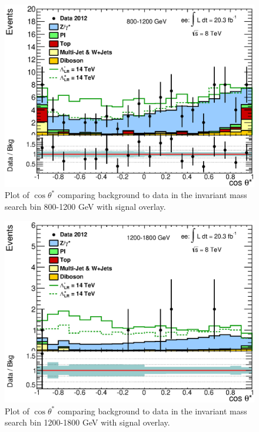 	\begin{figure}[ht]
		\centering
			\includegraphics[width=0.9\linewidth]{images/CosThetaStar_bin_3.eps}
		\caption{Plot of $\cos{\theta^{*}}$ comparing background to data in the invariant mass search bin 800-1200 GeV with signal overlay.}
		\label{fig:cosTS_3}
	\end{figure}


	\begin{figure}[ht]
		\centering
			\includegraphics[width=0.9\linewidth]{images/CosThetaStar_bin_4.eps}
		\caption{Plot of $\cos{\theta^{*}}$ comparing background to data in the invariant mass search bin 1200-1800 GeV with signal overlay.}
		\label{fig:cosTS_4}
	\end{figure}


